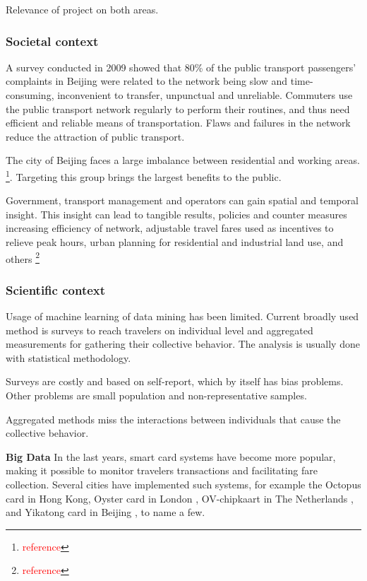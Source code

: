\documentclass{article}
\newcommand{\selfnote}[1]{\footnote{\textcolor{red}{#1}}}
\begin{document}
Relevance of project on both areas. 

\subsubsection{Societal context}
A survey conducted in 2009 showed that 80\% of the public transport passengers' complaints in Beijing were related to the network being slow and time-consuming, inconvenient to transfer, unpunctual and unreliable. Commuters use the public transport network regularly to perform their routines, and thus need efficient and reliable means of transportation. Flaws and failures in the network reduce the attraction of public transport. \cite{beijing2009research}

The city of Beijing faces a large imbalance between residential and working areas. \selfnote{reference}. Targeting this group brings the largest benefits to the public.  

Government, transport management and operators can gain spatial and temporal insight. This insight can lead to tangible results, policies and counter measures increasing efficiency of network, adjustable travel fares used as incentives to relieve peak hours, urban planning for residential and industrial land use, and others \selfnote{reference}

\subsubsection{Scientific context}
Usage of machine learning of data mining has been limited. Current broadly used method is surveys to reach travelers on individual level and aggregated measurements for gathering  their collective behavior. The analysis is usually done with statistical methodology. 

Surveys are costly and based on self-report, which by itself has bias problems. Other problems are small population and non-representative samples. 

Aggregated methods miss the interactions between individuals that cause the collective behavior. 

\textbf{Big Data}
In the last years, smart card systems have become more popular, making it possible to monitor travelers transactions and facilitating fare collection. Several cities have implemented such systems, for example the Octopus card in Hong Kong\cite{chau2003octopus}, Oyster card in London \cite{blythe2004improving}, OV-chipkaart in The Netherlands \cite{de2008analysis}, and Yikatong card in Beijing \cite{chan2010tactical}, to name a few.
\end{document}
